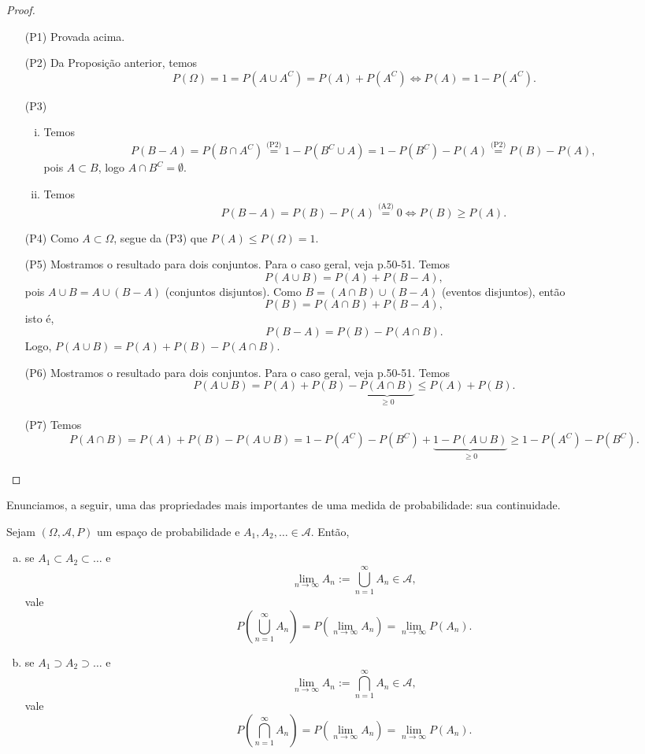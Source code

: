 \documentclass[../Notas.tex]{subfiles}
\begin{document}
\begin{proof}
\begin{itemize}
    \item[(P1)] Provada acima.
    \item[(P2)] Da Proposição anterior, temos 
    $$
    P(\Omega) = 1 = P(A\cup A^C) = P(A) + P(A^C) \Longleftrightarrow P(A) = 1- P(A^C).
    $$
    \item[(P3)]\begin{enumerate}[(i)]
        \item Temos
        $$
        P(B-A) = P(B\cap A^C) \stackrel{\text{(P2)}}{=} 1 - P(B^C\cup A) = 1 - P(B^C) - P(A) \stackrel{\text{(P2)}}{=} P(B) - P(A),
        $$
        pois $A\subset B$, logo $A\cap B^C = \emptyset$.
        \item Temos 
        $$
        P(B-A) = P(B) - P(A) \stackrel{\text{(A2)}}{=} 0 \Longleftrightarrow P(B) \geq P(A).
        $$
    \end{enumerate}
    \item[(P4)] Como $A\subset\Omega$, segue da (P3) que $P(A) \leq P(\Omega) = 1$.
    \item[(P5)] Mostramos o resultado para dois conjuntos. Para o caso geral, veja \cite{Ross} p.50-51. Temos
    $$
    P(A\cup B) = P(A) + P(B-A),
    $$
    pois $A\cup B = A\cup (B-A)$ (conjuntos disjuntos). Como $B = (A\cap B)\cup (B-A)$ (eventos disjuntos), então
    $$
    P(B) = P(A\cap B) + P(B-A),
    $$
    isto é, 
    $$
    P(B-A) = P(B) - P(A\cap B).
    $$
    Logo, $P(A\cup B) = P(A) + P(B) - P(A\cap B).$
    \item[(P6)] Mostramos o resultado para dois conjuntos. Para o caso geral, veja \cite{Ross} p.50-51. Temos 
    $$
    P(A\cup B) = P(A) + P(B) - \underbrace{P(A\cap B)}_{\geq 0} \leq P(A) + P(B).
    $$
    \item[(P7)] Temos 
    $$
    P(A\cap B) = P(A) + P(B) - P(A\cup B) = 1 - P(A^C) - P(B^C) + \underbrace{1 - P(A\cup B)}_{\geq 0} \geq 1 - P(A^C) - P(B^C).
    $$
\end{itemize}
\end{proof}

Enunciamos, a seguir, uma das propriedades mais importantes de uma medida de probabilidade: sua continuidade.

\begin{theorem}
Sejam $(\Omega, \mathcal{A}, P)$ um espaço de probabilidade e $A_1, A_2, \dots \in\mathcal{A}$. Então,
\begin{enumerate}[(a)]
    \item se $A_1\subset A_2\subset \dots$ e 
    $$
    \lim_{n\to\infty} A_n := \bigcup_{n=1}^{\infty}A_n\in\mathcal{A},
    $$
    vale
    $$
    P\left( \bigcup_{n=1}^{\infty}A_n \right) = P\left( \lim_{n\to\infty} A_n \right) = \lim_{n\to\infty} P(A_n).
    $$
    \item se $A_1\supset A_2\supset \dots$ e 
    $$
    \lim_{n\to\infty} A_n := \bigcap_{n=1}^{\infty}A_n\in\mathcal{A},
    $$
    vale
    $$
    P\left( \bigcap_{n=1}^{\infty}A_n \right) = P\left( \lim_{n\to\infty} A_n \right) = \lim_{n\to\infty} P(A_n).
    $$
\end{enumerate}
\end{theorem}
\end{document}
